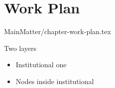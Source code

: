
%

\chapter{Work Plan}
\label{chap:work-plan}
MainMatter/chapter-work-plan.tex

Two layers
\begin{itemize}
    \item Institutional one
    \item Nodes inside institutional
\end{itemize}